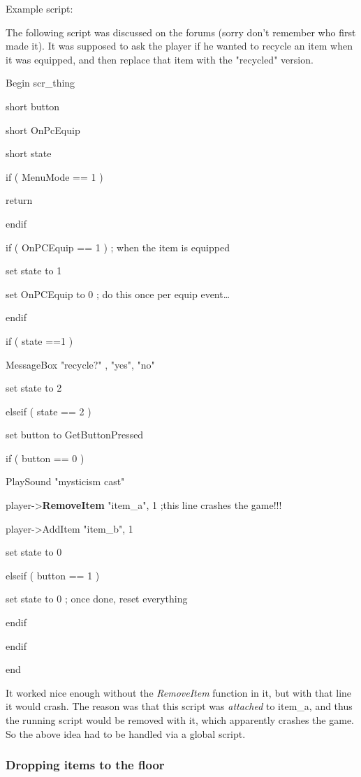 \documentclass[
]{article}
\begin{document}
Example script:

The following script was discussed on the forums (sorry don't remember
who first made it). It was supposed to ask the player if he wanted to
recycle an item when it was equipped, and then replace that item with
the "recycled" version.

Begin scr\_thing

short button

short OnPcEquip

short state

if ( MenuMode == 1 )

return

endif

if ( OnPCEquip == 1 ) ; when the item is equipped

set state to 1

set OnPCEquip to 0 ; do this once per equip event\ldots{}

endif

if ( state ==1 )

MessageBox "recycle?" , "yes", "no"

set state to 2

elseif ( state == 2 )

set button to GetButtonPressed

if ( button == 0 )

PlaySound "mysticism cast"

player-\textgreater{}\textbf{RemoveItem} "item\_a", 1 ;this line crashes
the game!!!

player-\textgreater AddItem "item\_b", 1

set state to 0

elseif ( button == 1 )

set state to 0 ; once done, reset everything

endif

endif

end

It worked nice enough without the \emph{RemoveItem} function in it, but
with that line it would crash. The reason was that this script was
\emph{attached} to item\_a, and thus the running script would be removed
with it, which apparently crashes the game. So the above idea had to be
handled via a global script.

\hypertarget{dropping-items-to-the-floor}{%
\subsubsection{Dropping items to the
floor}\label{dropping-items-to-the-floor}}
\end{document}
